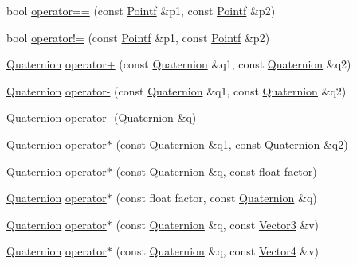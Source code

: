\begin{DoxyCompactItemize}
\item 
bool \hyperlink{namespaceprism_a13ab889958edc08eea9a5bea056cd9c1}{operator==} (const \hyperlink{classprism_1_1_pointf}{Pointf} \&p1, const \hyperlink{classprism_1_1_pointf}{Pointf} \&p2)
\item 
bool \hyperlink{namespaceprism_ae010d5880eb7bcf5119f006e26bf473f}{operator!=} (const \hyperlink{classprism_1_1_pointf}{Pointf} \&p1, const \hyperlink{classprism_1_1_pointf}{Pointf} \&p2)
\item 
\hyperlink{classprism_1_1_quaternion}{Quaternion} \hyperlink{namespaceprism_ad81bceaddc25922e571b4bf427ffe296}{operator+} (const \hyperlink{classprism_1_1_quaternion}{Quaternion} \&q1, const \hyperlink{classprism_1_1_quaternion}{Quaternion} \&q2)
\item 
\hyperlink{classprism_1_1_quaternion}{Quaternion} \hyperlink{namespaceprism_a5eae37b5dc73c544572686f215cea89d}{operator-\/} (const \hyperlink{classprism_1_1_quaternion}{Quaternion} \&q1, const \hyperlink{classprism_1_1_quaternion}{Quaternion} \&q2)
\item 
\hyperlink{classprism_1_1_quaternion}{Quaternion} \hyperlink{namespaceprism_ae04c2e5eae2242c58a967086ecad8ff4}{operator-\/} (\hyperlink{classprism_1_1_quaternion}{Quaternion} \&q)
\item 
\hyperlink{classprism_1_1_quaternion}{Quaternion} \hyperlink{namespaceprism_a74c3eeec91c3a178711b6f05a5487d70}{operator$\ast$} (const \hyperlink{classprism_1_1_quaternion}{Quaternion} \&q1, const \hyperlink{classprism_1_1_quaternion}{Quaternion} \&q2)
\item 
\hyperlink{classprism_1_1_quaternion}{Quaternion} \hyperlink{namespaceprism_a45806b1a58ec5aae0db87d399d4d832b}{operator$\ast$} (const \hyperlink{classprism_1_1_quaternion}{Quaternion} \&q, const float factor)
\item 
\hyperlink{classprism_1_1_quaternion}{Quaternion} \hyperlink{namespaceprism_ad9f03413053b1efa6851344eb39a5982}{operator$\ast$} (const float factor, const \hyperlink{classprism_1_1_quaternion}{Quaternion} \&q)
\item 
\hyperlink{classprism_1_1_quaternion}{Quaternion} \hyperlink{namespaceprism_a8aebd3615ba448915f37140515a37b05}{operator$\ast$} (const \hyperlink{classprism_1_1_quaternion}{Quaternion} \&q, const \hyperlink{classprism_1_1_vector3}{Vector3} \&v)
\item 
\hyperlink{classprism_1_1_quaternion}{Quaternion} \hyperlink{namespaceprism_a2c4c5e120d8c4de9891f2261a50f100e}{operator$\ast$} (const \hyperlink{classprism_1_1_quaternion}{Quaternion} \&q, const \hyperlink{classprism_1_1_vector4}{Vector4} \&v)

\end{DoxyCompactItemize}
